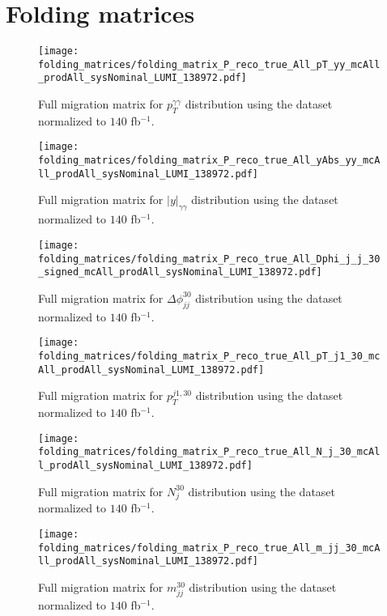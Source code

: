 \section{Folding matrices}
\begin{figure}[H]
\centering
\texttt{[image: folding\_matrices/folding\_matrix\_P\_reco\_true\_All\_pT\_yy\_mcAll\_prodAll\_sysNominal\_LUMI\_138972.pdf]}
\caption{Full migration matrix for $p_T^{\gamma\gamma}$ distribution using the dataset normalized to $140$ fb$^{-1}$.}
\end{figure}
\begin{figure}[H]
\centering
\texttt{[image: folding\_matrices/folding\_matrix\_P\_reco\_true\_All\_yAbs\_yy\_mcAll\_prodAll\_sysNominal\_LUMI\_138972.pdf]}
\caption{Full migration matrix for $|y|_{\gamma\gamma}$ distribution using the dataset normalized to $140$ fb$^{-1}$.}
\end{figure}
\begin{figure}[H]
\centering
\texttt{[image: folding\_matrices/folding\_matrix\_P\_reco\_true\_All\_Dphi\_j\_j\_30\_signed\_mcAll\_prodAll\_sysNominal\_LUMI\_138972.pdf]}
\caption{Full migration matrix for $\Delta\phi_{jj}^{30}$ distribution using the dataset normalized to $140$ fb$^{-1}$.}
\end{figure}
\begin{figure}[]
\centering
\texttt{[image: folding\_matrices/folding\_matrix\_P\_reco\_true\_All\_pT\_j1\_30\_mcAll\_prodAll\_sysNominal\_LUMI\_138972.pdf]}
\caption{Full migration matrix for $p_T^{j1, 30}$ distribution using the dataset normalized to $140$ fb$^{-1}$.}
\end{figure}
\begin{figure}[h]
\centering
\texttt{[image: folding\_matrices/folding\_matrix\_P\_reco\_true\_All\_N\_j\_30\_mcAll\_prodAll\_sysNominal\_LUMI\_138972.pdf]}
\caption{Full migration matrix for $N_j^{30}$ distribution using the dataset normalized to $140$ fb$^{-1}$.}
\end{figure}
\begin{figure}[H]
\centering
\texttt{[image: folding\_matrices/folding\_matrix\_P\_reco\_true\_All\_m\_jj\_30\_mcAll\_prodAll\_sysNominal\_LUMI\_138972.pdf]}
\caption{Full migration matrix for $m_{jj}^{30}$ distribution using the dataset normalized to $140$ fb$^{-1}$.}
\end{figure}